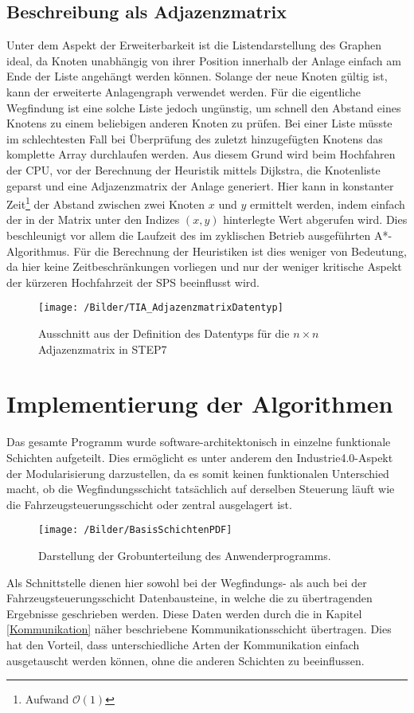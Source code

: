 		\subsection{Beschreibung als Adjazenzmatrix}
			\label{Adjazenzmatrix}
			Unter dem Aspekt der Erweiterbarkeit ist die Listendarstellung des Graphen ideal, da Knoten unabhängig von ihrer Position innerhalb der Anlage einfach am Ende der Liste angehängt werden können. Solange der neue Knoten gültig ist, kann der erweiterte Anlagengraph verwendet werden. Für die eigentliche Wegfindung ist eine solche Liste jedoch ungünstig, um schnell den Abstand eines Knotens zu einem beliebigen anderen Knoten zu prüfen. Bei einer Liste müsste im schlechtesten Fall bei Überprüfung des zuletzt hinzugefügten Knotens das komplette Array durchlaufen werden. Aus diesem Grund wird beim Hochfahren der CPU, vor der Berechnung der Heuristik mittels Dijkstra, die Knotenliste geparst und eine Adjazenzmatrix der Anlage generiert. Hier kann in konstanter Zeit\footnote{Aufwand $\mathcal{O}(1)$} der Abstand zwischen zwei Knoten $x$ und $y$ ermittelt werden, indem einfach der in der Matrix unter den Indizes $(x,y)$ hinterlegte Wert abgerufen wird. Dies beschleunigt vor allem die Laufzeit des im zyklischen Betrieb ausgeführten A*-Algorithmus. Für die Berechnung der Heuristiken ist dies weniger von Bedeutung, da hier keine Zeitbeschränkungen vorliegen und nur der weniger kritische Aspekt der kürzeren Hochfahrzeit der \ac{SPS} beeinflusst wird.
			
			\begin{figure}
				\centering
				\texttt{[image: /Bilder/TIA\_AdjazenzmatrixDatentyp]}
				\vspace{0.2cm}
				\caption{Ausschnitt aus der Definition des Datentyps für die $n\times n$ Adjazenzmatrix in \ac{STEP7}}
			\end{figure}

	\section{Implementierung der Algorithmen}
		
	
		Das gesamte Programm wurde software-architektonisch in einzelne funktionale Schichten aufgeteilt. Dies ermöglicht es unter anderem den Industrie4.0-Aspekt der Modularisierung darzustellen, da es somit keinen funktionalen Unterschied macht, ob die Wegfindungsschicht tatsächlich auf derselben Steuerung läuft wie die Fahrzeugsteuerungsschicht oder zentral ausgelagert ist.
		\begin{wrapfigure}{r}{5cm}
			\centering
			\texttt{[image: /Bilder/BasisSchichtenPDF]}
			\vspace{0.2cm}
			\caption{Darstellung der Grobunterteilung des Anwenderprogramms.}
		\end{wrapfigure}
		 Als Schnittstelle dienen hier sowohl bei der Wegfindungs- als auch bei der Fahrzeugsteuerungsschicht  Datenbausteine, in welche die zu übertragenden Ergebnisse geschrieben werden. Diese Daten werden durch die in Kapitel \ref{Kommunikation} näher beschriebene Kommunikationsschicht übertragen. Dies hat den Vorteil, dass unterschiedliche Arten der Kommunikation einfach ausgetauscht werden können, ohne die anderen Schichten zu beeinflussen.
		
